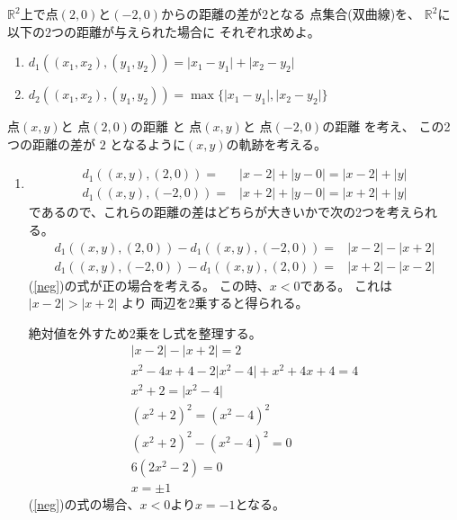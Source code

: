 \documentclass[12pt,b5paper]{ltjsarticle}
\begin{document}
$\mathbb{R}^2$上で点$(2,0)$と$(-2,0)$からの距離の差が$2$となる
点集合(双曲線)を、
$\mathbb{R}^2$に以下の$2$つの距離が与えられた場合に
それぞれ求めよ。
\begin{enumerate}
 \item $d_1((x_1,x_2), (y_1,y_2)) = \lvert x_1 - y_1\rvert + \lvert x_2 -y_2\rvert$
 \item $d_2((x_1,x_2), (y_1,y_2)) = \max\{\lvert x_1 - y_1\rvert , \lvert x_2 -y_2\rvert\}$
\end{enumerate}

\hrulefill

点$(x,y)$と 点$(2,0)$の距離 と
点$(x,y)$と 点$(-2,0)$の距離 を考え、
この2つの距離の差が $2$ となるように$(x,y)$の軌跡を考える。

\dotfill

\begin{enumerate}
 \item
      \begin{align}
       d_1((x,y), (2,0)) =& \lvert x - 2\rvert + \lvert y -0\rvert
       = \lvert x - 2\rvert + \lvert y\rvert\\
       d_1((x,y), (-2,0)) =& \lvert x + 2 \rvert + \lvert y -0\rvert
       = \lvert x + 2 \rvert + \lvert y \rvert
      \end{align}
      であるので、これらの距離の差はどちらが大きいかで次の2つを考えられる。
      \begin{align}
       \label{neg}
       d_1((x,y), (2,0)) - d_1((x,y), (-2,0))
        =& \lvert x - 2\rvert - \lvert x + 2\rvert\\
       \label{pos}
       d_1((x,y), (-2,0)) - d_1((x,y), (2,0))
       =& \lvert x + 2\rvert - \lvert x - 2\rvert
      \end{align}
      (\ref{neg})の式が正の場合を考える。
      この時、$x<0$である。
      これは$\lvert x - 2\rvert > \lvert x + 2\rvert$ より
      両辺を2乗すると得られる。

      絶対値を外すため2乗をし式を整理する。
      \begin{gather}
       \lvert x - 2\rvert - \lvert x + 2\rvert =2\\
       x^2-4x+4 -2\lvert x^2 - 4\rvert + x^2+4x+4=4\\
       x^2+2 =\lvert x^2 - 4\rvert\\
       (x^2+2)^2 =(x^2 - 4)^2\\
       (x^2+2)^2 -(x^2 - 4)^2=0\\
       6(2x^2-2)=0\\
       x=\pm 1
      \end{gather}
      (\ref{neg})の式の場合、$x<0$より$x=-1$となる。
      

\end{enumerate}
\end{document}
